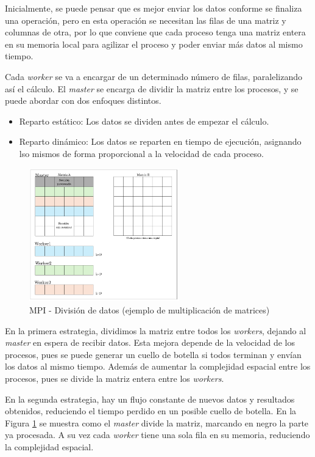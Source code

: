 	Inicialmente, se puede pensar que es mejor enviar los datos conforme se finaliza una operación, pero en esta operación se necesitan las filas de una matriz y columnas de otra, por lo que conviene que cada proceso tenga una matriz entera en su memoria local para agilizar el proceso y poder enviar más datos al mismo tiempo.


	Cada \textit{worker} se va a encargar de un determinado número de filas, paralelizando así el cálculo. El \textit{master} se encarga de dividir la matriz entre los procesos, y se puede abordar con dos enfoques distintos.
	\begin{itemize}
		\item Reparto estático: Los datos se dividen antes de empezar el cálculo. 
		\item Reparto dinámico: Los datos se reparten en tiempo de ejecución, asignando lso mismos de forma proporcional a la velocidad de cada proceso.
	\end{itemize}



	\begin{figure}[!h]
		\centering
		\includegraphics[width=0.58\textwidth]{images/chapter_3/matriz_mpi}
		\caption{MPI - División de datos (ejemplo de multiplicación de matrices)}
		\label{fig:matrizmpi}
	\end{figure}
	
	En la primera estrategia, dividimos la matriz entre todos los \textit{workers}, dejando al \textit{master} en espera de recibir datos. Esta mejora depende de la velocidad de los procesos, pues se puede generar un cuello de botella si todos terminan y envían los datos al mismo tiempo. Además de aumentar la complejidad espacial entre los procesos, pues se divide la matriz entera entre los \textit{workers}. 
	
	En la segunda estrategia, hay un flujo constante de nuevos datos y resultados obtenidos, reduciendo el tiempo perdido en un posible cuello de botella. En la Figura \ref{fig:matrizmpi} se muestra como el \textit{master} divide la matriz, marcando en negro la parte ya procesada. A su vez cada \textit{worker} tiene una sola fila en su memoria, reduciendo la complejidad espacial.
	
